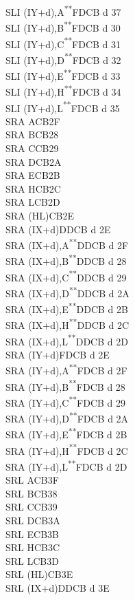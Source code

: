 \documentclass[12pt,twoside,openright,a4paper]{book}
\newcommand{\UNDOC}{\textnormal{\textsuperscript{**}}}
\begin{document}
\begin{multicols}{3}
{\begin{tabbing}
		SLI (IY+d),A\UNDOC\>FDCB d 37\\
		SLI (IY+d),B\UNDOC\>FDCB d 30\\
		SLI (IY+d),C\UNDOC\>FDCB d 31\\
		SLI (IY+d),D\UNDOC\>FDCB d 32\\
		SLI (IY+d),E\UNDOC\>FDCB d 33\\
		SLI (IY+d),H\UNDOC\>FDCB d 34\\
		SLI (IY+d),L\UNDOC\>FDCB d 35\\
		SRA A\>CB2F\\
		SRA B\>CB28\\
		SRA C\>CB29\\
		SRA D\>CB2A\\
		SRA E\>CB2B\\
		SRA H\>CB2C\\
		SRA L\>CB2D\\
		SRA (HL)\>CB2E\\
		SRA (IX+d)\>DDCB d 2E\\
		SRA (IX+d),A\UNDOC\>DDCB d 2F\\
		SRA (IX+d),B\UNDOC\>DDCB d 28\\
		SRA (IX+d),C\UNDOC\>DDCB d 29\\
		SRA (IX+d),D\UNDOC\>DDCB d 2A\\
		SRA (IX+d),E\UNDOC\>DDCB d 2B\\
		SRA (IX+d),H\UNDOC\>DDCB d 2C\\
		SRA (IX+d),L\UNDOC\>DDCB d 2D\\
		SRA (IY+d)\>FDCB d 2E\\
		SRA (IY+d),A\UNDOC\>FDCB d 2F\\
		SRA (IY+d),B\UNDOC\>FDCB d 28\\
		SRA (IY+d),C\UNDOC\>FDCB d 29\\
		SRA (IY+d),D\UNDOC\>FDCB d 2A\\
		SRA (IY+d),E\UNDOC\>FDCB d 2B\\
		SRA (IY+d),H\UNDOC\>FDCB d 2C\\
		SRA (IY+d),L\UNDOC\>FDCB d 2D\\
		SRL A\>CB3F\\
		SRL B\>CB38\\
		SRL C\>CB39\\
		SRL D\>CB3A\\
		SRL E\>CB3B\\
		SRL H\>CB3C\\
		SRL L\>CB3D\\
		SRL (HL)\>CB3E\\
		SRL (IX+d)\>DDCB d 3E\\

\end{tabbing}}
\end{multicols}
\end{document}
